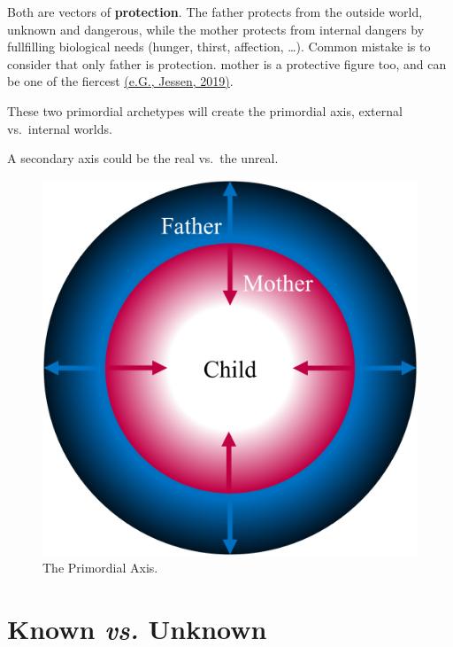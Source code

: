 \documentclass[
]{book}
\begin{document}
Both are vectors of \textbf{protection}. The father protects from the outside world, unknown and dangerous, while the mother protects from internal dangers by fullfilling biological needs (hunger, thirst, affection, \ldots). Common mistake is to consider that only father is protection. mother is a protective figure too, and can be one of the fiercest \href{https://doi.org/10.1101/827626}{(e.G., Jessen, 2019)}.

These two primordial archetypes will create the primordial axis, external vs.~internal worlds.

A secondary axis could be the real vs.~the unreal.

\begin{figure}

{\centering \includegraphics[width=\textwidth]{img/protection} 

}

\caption{The Primordial Axis.}\label{fig:unnamed-chunk-13}
\end{figure}

\hypertarget{known-vs.-unknown}{%
\section{\texorpdfstring{Known \emph{vs.} Unknown}{Known vs. Unknown}}\label{known-vs.-unknown}}
\end{document}
